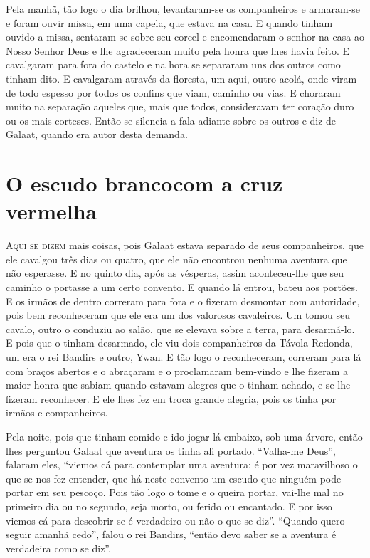 Pela manhã, tão logo o dia brilhou, levantaram-se os companheiros e armaram-se e
foram ouvir missa, em uma capela, que estava na casa. E quando tinham ouvido a
missa, sentaram-se sobre seu corcel e encomendaram o senhor na casa ao Nosso
Senhor Deus e lhe agradeceram muito pela honra que lhes havia feito. E
cavalgaram para fora do castelo e na hora se separaram uns dos outros como
tinham dito. E cavalgaram através da floresta, um aqui, outro acolá, onde viram
de todo espesso por todos os confins que viam, caminho ou vias. E choraram
muito na separação aqueles que, mais que todos, consideravam ter coração duro
ou os mais corteses. Então se silencia a fala adiante sobre os outros e diz de
Galaat, quando era autor desta demanda. 
\oneside

\chapter[O escudo branco com a cruz vermelha]{O escudo branco\break com a cruz vermelha}

\textsc{Aqui se dizem} mais coisas, pois Galaat estava separado de seus companheiros, que
ele cavalgou três dias ou quatro, que ele não encontrou nenhuma aventura que
não esperasse. E no quinto dia, após as vésperas, assim aconteceu-lhe que seu
caminho o portasse a um certo convento. E quando lá entrou, bateu aos portões.
E os irmãos de dentro correram para fora e o fizeram desmontar com autoridade,
pois bem reconheceram que ele era um dos valorosos cavaleiros. Um tomou seu
cavalo, outro o conduziu ao salão, que se elevava sobre a terra, para
desarmá-lo. E pois que o tinham desarmado, ele viu dois companheiros da Távola
Redonda, um era o rei Bandirs e outro, Ywan. E tão logo o reconheceram,
correram para lá com braços abertos e o abraçaram e o proclamaram bem-vindo e
lhe fizeram a maior honra que sabiam quando estavam alegres que o tinham
achado, e se lhe fizeram reconhecer. E ele lhes fez em troca grande alegria,
pois os tinha por irmãos e companheiros. 

Pela noite, pois que tinham comido e ido jogar lá embaixo, sob uma árvore,
então lhes perguntou Galaat que aventura os tinha ali portado. “Valha-me Deus”,
falaram eles, “viemos cá para contemplar uma aventura; é por vez maravilhoso o
que se nos fez entender, que há neste convento um escudo que ninguém pode
portar em seu pescoço. Pois tão logo o tome e o queira portar, vai-lhe mal no
primeiro dia ou no segundo, seja morto, ou ferido ou encantado. E por isso
viemos cá para descobrir se é verdadeiro ou não o que se diz”. “Quando quero
seguir amanhã cedo”, falou o rei Bandirs, “então devo saber se a aventura é
verdadeira como se diz”. 

